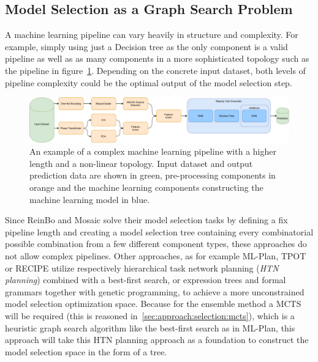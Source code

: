 \subsection{Model Selection as a Graph Search Problem}
\label{sec:approach:selection:search}
A machine learning pipeline can vary heavily in structure and complexity.
For example, simply using just a Decision tree as the only component is a valid pipeline as well as as many components in a more sophisticated topology such as the pipeline in figure~\ref{fig:approach:complex-pipeline}.
Depending on the concrete input dataset, both levels of pipeline complexity could be the optimal output of the model selection step.
\begin{figure}[ht!]
    \centering
    \includegraphics[width=\textwidth]{gfx/Figures/Approach/ComplexPipeline.pdf}
    \caption[An example of a complex machine learning pipeline with a higher length and a non-linear topology.]{An example of a complex machine learning pipeline with a higher length and a non-linear topology. Input dataset and output prediction data are shown in green, pre-processing components in orange and the machine learning components constructing the machine learning model in blue.}
    \label{fig:approach:complex-pipeline}
\end{figure}

Since ReinBo and Mosaic solve their model selection tasks by defining a fix pipeline length and creating a model selection tree containing every combinatorial possible combination from a few different component types, these approaches do not allow complex pipelines.\newline
Other approaches, as for example ML-Plan, TPOT or RECIPE utilize respectively hierarchical task network planning (\textit{HTN planning}) combined with a best-first search, or expression trees and formal grammars together with genetic programming, to achieve a more unconstrained model selection optimization space.
Because for the ensemble method a MCTS will be required (this is reasoned in~\ref{sec:approach:selection:mcts}), which is a heuristic graph search algorithm like the best-first search as in ML-Plan, this approach will take this HTN planning approach as a foundation to construct the model selection space in the form of a tree.


